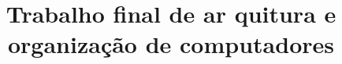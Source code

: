 \documentclass{article}
\title{Trabalho final de ar quitura e organização de computadores}
\begin{document}
	
	
	
	
	
	
	
	\nocite{edson}
	\nocite{manual_intel}
	\nocite{patterson}
	\nocite{pdf_estranho}
	
	
	
\end{document}
